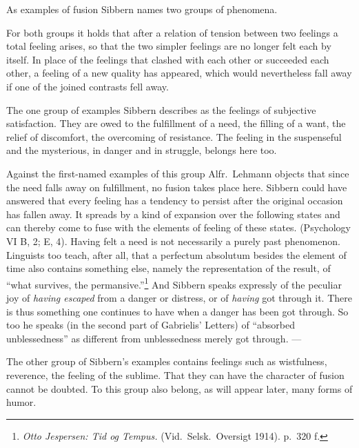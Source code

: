 \documentclass[12pt]{book}
\newcommand{\opage}[1]{\marginnote{\footnotesize\textit{[#1]}}}
\begin{document}
As examples of fusion Sibbern names two groups of phenomena.

For both groups it holds that after a relation of tension between two feelings a
total feeling arises, so that the two simpler feelings are no longer felt each by
itself. In place of the feelings that clashed with each other or succeeded each
other, a feeling of a new quality has appeared, which would nevertheless fall
away if one of the joined contrasts fell away.

The one group of examples Sibbern describes as the feelings of subjective
satisfaction. They are owed to the fulfillment of a need, the filling of a want,
the relief of discomfort, the overcoming of resistance. The feeling in the
suspenseful and the mysterious, in danger and in struggle, belongs here too.

Against the first-named examples of this group Alfr.\ Lehmann objects that since
the need falls away on fulfillment, no fusion takes place here. Sibbern could
have answered that every feeling has a tendency to persist after the original
occasion has fallen away. It spreads by a kind of expansion over the following
states and can thereby come to fuse with the elements of feeling of these states.
(Psychology VI B, 2; E, 4). Having felt a need is not necessarily a purely past
phenomenon. Linguists too teach, after all, that a perfectum absolutum besides
the element of time also \opage{30}contains something else, namely the
representation of the result, of ``what survives, the permansive.''\footnote{%
\textit{Otto Jespersen: Tid og Tempus.} (Vid.\ Selsk.\ Oversigt 1914). p.~320 f.}
And Sibbern speaks expressly of the peculiar joy of \emph{having escaped} from a
danger or distress, or of \emph{having} got through it. There is thus something one
continues to have when a danger has been got through. So too he speaks (in the
second part of Gabrielis' Letters) of ``absorbed unblessedness'' as different
from unblessedness merely got through. ---

The other group of Sibbern's examples contains feelings such as wistfulness,
reverence, the feeling of the sublime. That they can have the character of fusion
cannot be doubted. To this group also belong, as will appear later, many forms of
humor.
\end{document}
